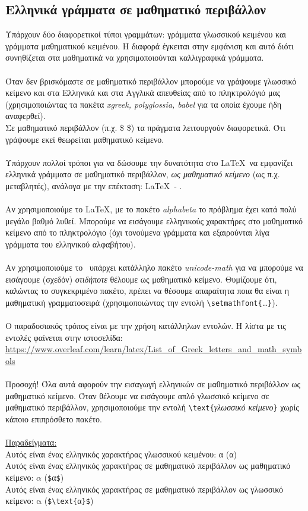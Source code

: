 \documentclass[a4paper, 12pt, oneside, xelatex, final]{article}
\begin{document}
	\subsection{Ελληνικά γράμματα σε μαθηματικό περιβάλλον}
	\noindent Υπάρχουν δύο διαφορετικοί τύποι γραμμάτων: γράμματα γλωσσικού κειμένου και γράμματα μαθηματικού κειμένου. Η διαφορά έγκειται στην εμφάνιση και αυτό διότι συνηθίζεται στα μαθηματικά να χρησιμοποιούνται καλλιγραφικά γράμματα.\\
	\\
	Όταν δεν βρισκόμαστε σε μαθηματικό περιβάλλον μπορούμε να γράψουμε γλωσσικό κείμενο και στα Ελληνικά και στα Αγγλικά απευθείας από το πληκτρολόγιό μας (χρησιμοποιώντας τα πακέτα \emph{xgreek, polyglossia, babel} για τα οποία έχουμε ήδη αναφερθεί).\\
	Σε μαθηματικό περιβάλλον (π.χ. \$ \$) τα πράγματα λειτουργούν διαφορετικά. Ότι γράψουμε εκεί θεωρείται μαθηματικό κείμενο.\\
	\\
	Υπάρχουν πολλοί τρόποι για να δώσουμε την δυνατότητα στο \LaTeX\ να εμφανίζει ελληνικά γράμματα σε μαθηματικό περιβάλλον, \emph{ως μαθηματικό κείμενο} (ως π.χ. μεταβλητές), ανάλογα με την επέκταση: \LaTeX\ - \XeLaTeX.\\
	\\
	Αν χρησιμοποιούμε το \LaTeX, με το πακέτο  \emph{alphabeta} το πρόβλημα έχει κατά πολύ μεγάλο βαθμό λυθεί. Μπορούμε να εισάγουμε ελληνικούς χαρακτήρες στο μαθηματικό κείμενο από το πληκτρολόγιο (όχι τονούμενα γράμματα και εξαιρούνται λίγα γράμματα του ελληνικού αλφαβήτου).\\
	\hfill \\
	\noindent Αν χρησιμοποιούμε το \XeLaTeX\ υπάρχει κατάλληλο πακέτο \emph{unicode-math} για να μπορούμε να εισάγουμε (σχεδόν) \emph{οτιδήποτε} θέλουμε ως μαθηματικό κείμενο. Θυμίζουμε ότι, καλώντας το συγκεκριμένο πακέτο, πρέπει να θέσουμε απαραίτητα ποια θα είναι η μαθηματική γραμματοσειρά (χρησιμοποιώντας την εντολή \verb+\setmathfont{+\ldots\verb+}+).\\ 
	\\
	Ο παραδοσιακός τρόπος είναι με την χρήση κατάλληλων εντολών. Η λίστα με τις εντολές φαίνεται στην ιστοσελίδα: \url{https://www.overleaf.com/learn/latex/List_of_Greek_letters_and_math_symbols}\\ \\
	Προσοχή! Όλα αυτά αφορούν την εισαγωγή ελληνικών σε μαθηματικό περιβάλλον ως μαθηματικό κείμενο. Όταν θέλουμε να εισάγουμε απλό γλωσσικό κείμενο σε μαθηματικό περιβάλλον, χρησιμοποιούμε την εντολή \verb|\text{|\emph{γλωσσικό κείμενο}\verb|}| χωρίς κάποιο επιπρόσθετο πακέτο.\\
	\\
	\underline{Παραδείγματα:}\\
	Αυτός είναι ένας ελληνικός χαρακτήρας γλωσσικού κειμένου: α (α)\\
	Αυτός είναι ένας ελληνικός χαρακτήρας σε μαθηματικό περιβάλλον ως μαθηματικό κείμενο: $\alpha$ (\verb+$+α\verb+$+)\\
	Αυτός είναι ένας ελληνικός χαρακτήρας σε μαθηματικό περιβάλλον ως γλωσσικό κείμενο: $\text{α}$ (\verb+$\text{+α\verb+}$+)	
\newpage
\end{document}
